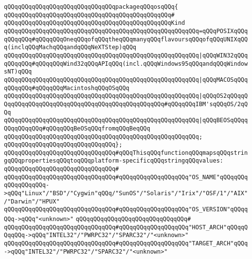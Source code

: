 \newline
\verb|qQQqqQQqqQQqqQQqqQQqqQQqqQQqqQQqpackageqQQqosqQQq{|\newline
\verb|qQQqqQQqqQQqqQQqqQQqqQQqqQQqqQQqqQQqqQQqqQQqqQQq#|\newline
\verb|qQQqqQQqqQQqqQQqqQQqqQQqqQQqqQQqqQQqqQQqqQQqqQQqKind|\newline
\verb|qQQqqQQqqQQqqQQqqQQqqQQqqQQqqQQqqQQqqQQqqQQqqQQqqQQqqQQq=qQQqPOSIXqQQqqQQqqQQq#qQQqqQQqOneqQQqofqQQqtheqQQqmanyqQQqflavoursqQQqofqQQqUNIXqQQq(inclqQQqMachqQQqandqQQqNeXTStep)qQQq|\newline
\verb|qQQqqQQqqQQqqQQqqQQqqQQqqQQqqQQqqQQqqQQqqQQqqQQqqQQqqQQq|\verb#|qQQqWIN32qQQqqQQqqQQq#\verb|#qQQqqQQqWind32qQQqAPIqQQq(incl.qQQqWindows95qQQqandqQQqWindowsNT)qQQq|\newline
\verb|qQQqqQQqqQQqqQQqqQQqqQQqqQQqqQQqqQQqqQQqqQQqqQQqqQQqqQQq|\verb#|qQQqMACOSqQQqqQQqqQQq#\verb|#qQQqqQQqMacintoshqQQqOSqQQq|\newline
\verb|qQQqqQQqqQQqqQQqqQQqqQQqqQQqqQQqqQQqqQQqqQQqqQQqqQQqqQQq|\verb#|qQQqOS2qQQqqQQqqQQqqQQqqQQqqQQqqQQqqQQqqQQqqQQqqQQqqQQqqQQq#\verb|#qQQqqQQqIBM'sqQQqOS/2qQQq|\newline
\verb|qQQqqQQqqQQqqQQqqQQqqQQqqQQqqQQqqQQqqQQqqQQqqQQqqQQqqQQq|\verb#|qQQqBEOSqQQqqQQqqQQqqQQq#\verb|#qQQqqQQqBeOSqQQqfromqQQqBeqQQq|\newline
\verb|qQQqqQQqqQQqqQQqqQQqqQQqqQQqqQQqqQQqqQQqqQQqqQQqqQQqqQQq;|\newline
\verb|qQQqqQQqqQQqqQQqqQQqqQQqqQQqqQQq};|\newline
\newline
\verb|qQQqqQQqqQQqqQQqqQQqqQQqqQQqqQQq#qQQqThisqQQqfunctionqQQqmapsqQQqstringqQQqpropertiesqQQqtoqQQqplatform-specificqQQqstringqQQqvalues:|\newline
\verb|qQQqqQQqqQQqqQQqqQQqqQQqqQQqqQQq#|\newline
\verb|qQQqqQQqqQQqqQQqqQQqqQQqqQQqqQQq#qQQqqQQqqQQqqQQqqQQq"OS_NAME"qQQqqQQqqQQqqQQqqQQq->qQQq"Linux"/"BSD"/"Cygwin"qQQq/"SunOS"/"Solaris"/"Irix"/"OSF/1"/"AIX"/"Darwin"/"HPUX"|\newline
\verb|qQQqqQQqqQQqqQQqqQQqqQQqqQQqqQQq#qQQqqQQqqQQqqQQqqQQq"OS_VERSION"qQQqqQQq->qQQq"<unknown>"|\newline
\verb|qQQqqQQqqQQqqQQqqQQqqQQqqQQqqQQq#|\newline
\verb|qQQqqQQqqQQqqQQqqQQqqQQqqQQqqQQq#qQQqqQQqqQQqqQQqqQQq"HOST_ARCH"qQQqqQQqqQQq->qQQq"INTEL32"/"PWRPC32"/"SPARC32"/"<unknown>"|\newline
\verb|qQQqqQQqqQQqqQQqqQQqqQQqqQQqqQQq#qQQqqQQqqQQqqQQqqQQq"TARGET_ARCH"qQQq->qQQq"INTEL32"/"PWRPC32"/"SPARC32"/"<unknown>"|\newline
